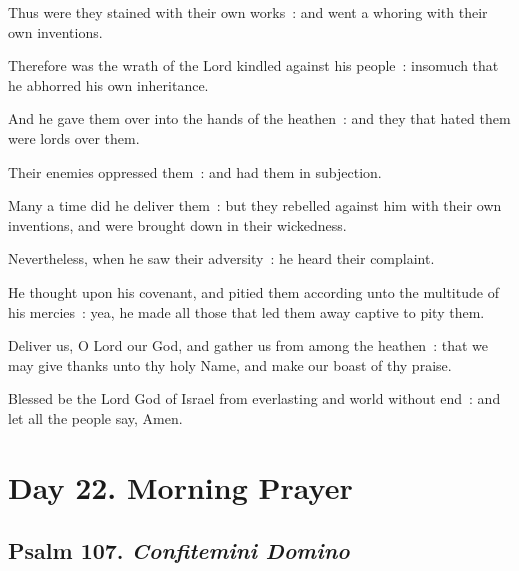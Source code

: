 Thus were they stained with their own works~: and went a whoring with their own inventions.\par
{}Therefore was the wrath of the Lord kindled against his people~: insomuch that he abhorred his own inheritance.\par
{}And he gave them over into the hands of the heathen~: and they that hated them were lords over them.\par
{}Their enemies oppressed them~: and had them in subjection.\par
{}Many a time did he deliver them~: but they rebelled against him with their own inventions, and were brought down in their wickedness.\par
{}Nevertheless, when he saw their adversity~: he heard their complaint.\par
{}He thought upon his covenant, and pitied them according unto the multitude of his mercies~: yea, he made all those that led them away captive to pity them.\par
{}Deliver us, O Lord our God, and gather us from among the heathen~: that we may give thanks unto thy holy Name, and make our boast of thy praise.\par
{}Blessed be the Lord God of Israel from everlasting and world without end~: and let all the people say, Amen.\par

\section*{Day 22. Morning Prayer}

\subsection{Psalm 107. \textit{Confitemini Domino}}

